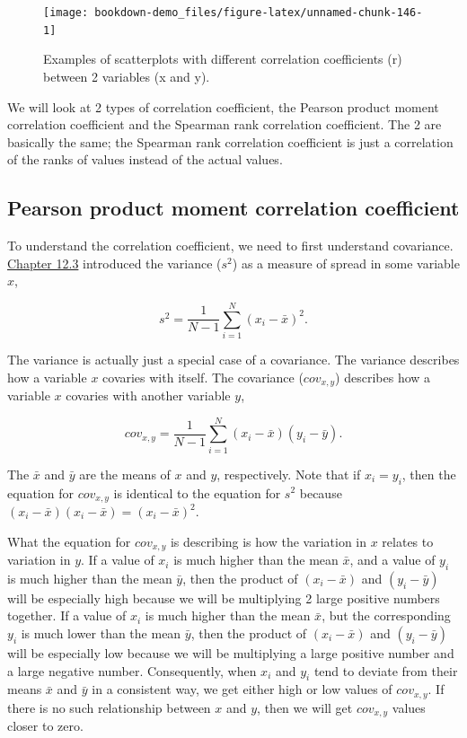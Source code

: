 \documentclass[
]{scrbook}
\begin{document}
\begin{figure}
\texttt{[image: bookdown-demo\_files/figure-latex/unnamed-chunk-146-1]} \caption{Examples of scatterplots with different correlation coefficients (r) between 2 variables (x and y).}\label{fig:unnamed-chunk-146}
\end{figure}

We will look at 2 types of correlation coefficient, the Pearson product moment correlation coefficient and the Spearman rank correlation coefficient.
The 2 are basically the same; the Spearman rank correlation coefficient is just a correlation of the ranks of values instead of the actual values.

\hypertarget{pearson-product-moment-correlation-coefficient}{%
\subsection{Pearson product moment correlation coefficient}\label{pearson-product-moment-correlation-coefficient}}

To understand the correlation coefficient, we need to first understand covariance.
\protect\hyperlink{the-variance}{Chapter 12.3} introduced the variance (\(s^{2}\)) as a measure of spread in some variable \(x\),

\[s^{2} = \frac{1}{N - 1}\sum_{i = 1}^{N}\left(x_{i} - \bar{x} \right)^{2}.\]

The variance is actually just a special case of a covariance.
The variance describes how a variable \(x\) covaries with itself.
The covariance (\(cov_{x,y}\)) describes how a variable \(x\) covaries with another variable \(y\),

\[cov_{x, y} = \frac{1}{N - 1} \sum_{i = 1}^{N}\left(x_{i} - \bar{x} \right) \left(y_{i} - \bar{y} \right).\]

The \(\bar{x}\) and \(\bar{y}\) are the means of \(x\) and \(y\), respectively.
Note that if \(x_{i} = y_{i}\), then the equation for \(cov_{x,y}\) is identical to the equation for \(s^{2}\) because \(\left(x_{i} - \bar{x} \right) \left(x_{i} - \bar{x} \right) = \left(x_{i} - \bar{x} \right)^{2}\).

What the equation for \(cov_{x,y}\) is describing is how the variation in \(x\) relates to variation in \(y\).
If a value of \(x_{i}\) is much higher than the mean \(\bar{x}\), and a value of \(y_{i}\) is much higher than the mean \(\bar{y}\), then the product of \(\left(x_{i} - \bar{x} \right)\) and \(\left(y_{i} - \bar{y} \right)\) will be especially high because we will be multiplying 2 large positive numbers together.
If a value of \(x_{i}\) is much higher than the mean \(\bar{x}\), but the corresponding \(y_{i}\) is much lower than the mean \(\bar{y}\), then the product of \(\left(x_{i} - \bar{x} \right)\) and \(\left(y_{i} - \bar{y} \right)\) will be especially low because we will be multiplying a large positive number and a large negative number.
Consequently, when \(x_{i}\) and \(y_{i}\) tend to deviate from their means \(\bar{x}\) and \(\bar{y}\) in a consistent way, we get either high or low values of \(cov_{x,y}\).
If there is no such relationship between \(x\) and \(y\), then we will get \(cov_{x,y}\) values closer to zero.
\end{document}
